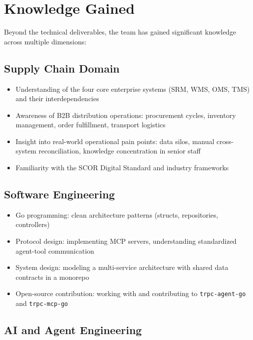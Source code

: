 \documentclass[12pt,a4paper]{report}
\begin{document}
\section{Knowledge Gained}

Beyond the technical deliverables, the team has gained significant knowledge across multiple dimensions:

\subsection{Supply Chain Domain}

\begin{itemize}[itemsep=0.3em]
    \item Understanding of the four core enterprise systems (SRM, WMS, OMS, TMS) and their interdependencies
    \item Awareness of B2B distribution operations: procurement cycles, inventory management, order fulfillment, transport logistics
    \item Insight into real-world operational pain points: data silos, manual cross-system reconciliation, knowledge concentration in senior staff
    \item Familiarity with the SCOR Digital Standard and industry frameworks
\end{itemize}

\subsection{Software Engineering}

\begin{itemize}[itemsep=0.3em]
    \item Go programming: clean architecture patterns (structs, repositories, controllers)
    \item Protocol design: implementing MCP servers, understanding standardized agent-tool communication
    \item System design: modeling a multi-service architecture with shared data contracts in a monorepo
    \item Open-source contribution: working with and contributing to \texttt{trpc-agent-go} and \texttt{trpc-mcp-go}
\end{itemize}

\subsection{AI and Agent Engineering}
\end{document}
